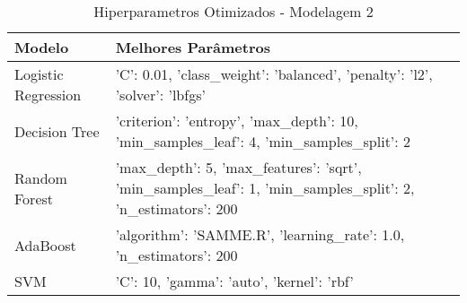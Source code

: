 \begin{table}[H] %
    \centering
    \caption{Hiperparametros Otimizados - Modelagem 2}
    \label{tab:melhores_parametros_otimizacao_modelagem_2}
    \renewcommand{\arraystretch}{1.25} %
    \begin{adjustwidth}{ -1in }{ -1in } %
    \centering %
    \small %
    \begin{tabular}{ll}
\toprule
             Modelo &                                                                                          Melhores Parâmetros \\
\midrule
Logistic Regression &                                  {'C': 0.01, 'class_weight': 'balanced', 'penalty': 'l2', 'solver': 'lbfgs'} \\
      Decision Tree &                     {'criterion': 'entropy', 'max_depth': 10, 'min_samples_leaf': 4, 'min_samples_split': 2} \\
      Random Forest & {'max_depth': 5, 'max_features': 'sqrt', 'min_samples_leaf': 1, 'min_samples_split': 2, 'n_estimators': 200} \\
           AdaBoost &                                          {'algorithm': 'SAMME.R', 'learning_rate': 1.0, 'n_estimators': 200} \\
                SVM &                                                                  {'C': 10, 'gamma': 'auto', 'kernel': 'rbf'} \\
\bottomrule
\end{tabular}
    \end{adjustwidth}
    \renewcommand{\arraystretch}{1.0} %
\end{table}
